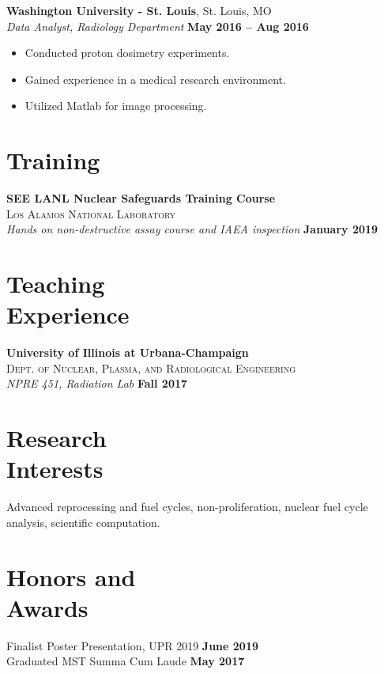 \documentclass[margin,line]{resume}
\begin{document}
\begin{resume}
    \textbf{Washington University - St. Louis}, St. Louis, MO\\
		\textsl{Data Analyst, Radiology Department} \hfill \textbf{May 2016 -- Aug 2016}\\
		\begin{itemize}
			\item Conducted proton dosimetry experiments.
			\item Gained experience in a medical research environment.
			\item Utilized Matlab for image processing.
		\end{itemize}
	
	\section{\mysidestyle Training}
	\textbf{SEE LANL Nuclear Safeguards Training Course}\\
		\textsc{Los Alamos National Laboratory}\\
			\textsl{Hands on non-destructive assay course and IAEA inspection} 
			\hfill \textbf{January 2019}
			
	\section{\mysidestyle Teaching\\Experience}
	\textbf{University of Illinois at Urbana-Champaign}\\
	\textsc{Dept. of Nuclear, Plasma, and Radiological Engineering}\\ 
	\textsl{NPRE 451, Radiation Lab} \hfill \textbf{Fall 2017}
	\section{\mysidestyle Research\\Interests}
	Advanced reprocessing and fuel cycles, non-proliferation, 
		nuclear fuel cycle analysis, scientific computation.%
    \section{\mysidestyle Honors and\\Awards}
    Finalist Poster Presentation, UPR 2019 \hfill \textbf{June 2019}\\
    Graduated MST Summa Cum Laude \hfill \textbf{May 2017}
    

\end{resume}
\end{document}
